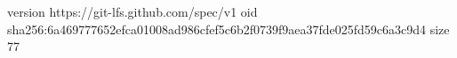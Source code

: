 version https://git-lfs.github.com/spec/v1
oid sha256:6a469777652efca01008ad986cfef5c6b2f0739f9aea37fde025fd59c6a3c9d4
size 77
